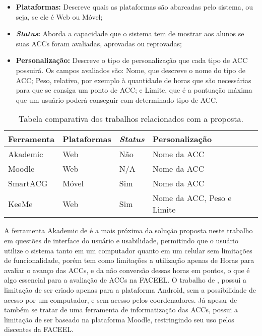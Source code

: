 \begin{itemize}
    \item \textbf{Plataformas:} Descreve quais as plataformas são abarcadas pelo sistema, ou seja, se ele é Web ou Móvel;
    \item \textbf{\textit{Status}:} Aborda a capacidade que o sistema tem de mostrar aos alunos se suas ACCs foram avaliadas, aprovadas ou reprovadas;
    \item \textbf{Personalização:} Descreve o tipo de personalização que cada tipo de ACC possuirá. Os campos avaliados são: Nome, que descreve o nome do tipo de ACC; Peso, relativo, por exemplo à quantidade de horas que são necessárias para que se consiga um ponto de ACC; e Limite, que é a pontuação máxima que um usuário poderá conseguir com determinado tipo de ACC.
\end{itemize}

\begin{table}[H]
\centering
\caption{Tabela comparativa dos trabalhos relacionados com a proposta.}
\label{table:ComparacaoArtigos}
\begin{tabular}{|C{3.64cm}|C{3.14cm}|C{2.78cm}|C{4.64cm}|}
\hline
\textbf{Ferramenta} & \textbf{Plataformas} & \textbf{\textit{Status}} & \textbf{Personalização} \\
\hline
Akademic & Web & Não  & Nome da ACC \\ \hline
Moodle & Web & N/A & Nome da ACC \\ \hline
SmartACG & Móvel & Sim & Nome da ACC \\ \hline
KeeMe & Web & Sim & Nome da ACC, Peso e Limite \\ \hline
\end{tabular}
\end{table}

A ferramenta Akademic de \cite{de2018implementaccao} é a mais próxima da solução proposta neste trabalho em questões de interface do usuário e usabilidade, permitindo que o usuário utilize o sistema tanto em um computador quanto em um celular sem limitações de funcionalidade, porém tem como limitações a utilização apenas de Horas para avaliar o avanço das ACCs, e da não conversão dessas horas em pontos, o que é algo essencial para a avaliação de ACCs na FACEEL. O trabalho de \cite{cunha2014unipampa}, possui a limitação de ser criado apenas para a plataforma Android, sem a possibilidade de acesso por um computador, e sem acesso pelos coordenadores. Já \cite{silva2013processo} apesar de também se tratar de uma ferramenta de informatização das ACCs, possui a limitação de ser baseado na plataforma Moodle, restringindo seu uso pelos discentes da FACEEL.


